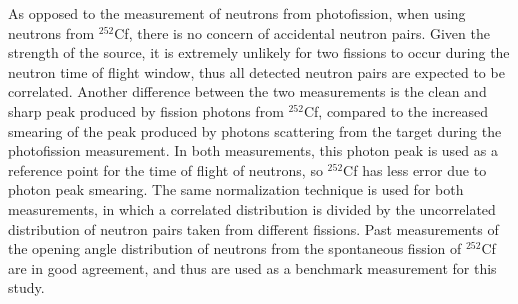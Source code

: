 As opposed to the measurement of neutrons from photofission, when using neutrons from $^{252}$Cf, there is no concern of accidental neutron pairs.
Given the strength of the source, it is extremely unlikely for two fissions to occur during the neutron time of flight window, thus all detected neutron pairs are expected to be correlated.
Another difference between the two measurements is the clean and sharp peak produced by fission photons from $^{252}$Cf, compared to the increased smearing of the peak produced by photons scattering from the target during the photofission measurement.
In both measurements, this photon peak is used as a reference point for the time of flight of neutrons, so $^{252}$Cf has less error due to photon peak smearing.
The same normalization technique is used for both measurements, in which a correlated distribution is divided by the uncorrelated distribution of neutron pairs taken from different fissions.
Past measurements of the opening angle distribution of neutrons from the spontaneous fission of $^{252}$Cf are in good agreement, and thus are used as a benchmark measurement for this study.

